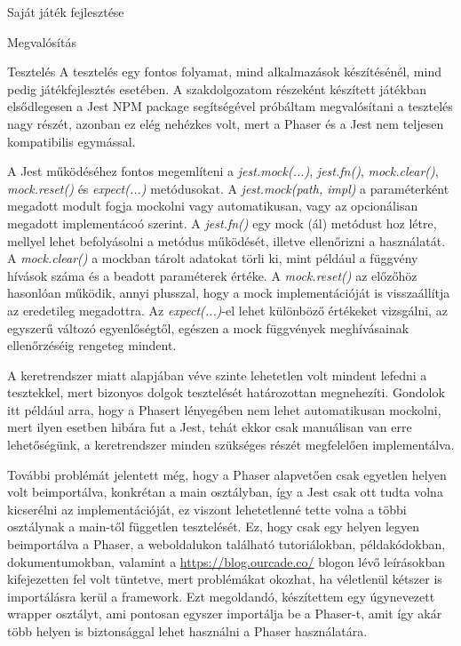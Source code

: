 \begin{MyChapter}{Saját játék fejlesztése}
\begin{MySection}{Megvalósítás}
	\end{MySection}
	
	\begin{MySection}{Tesztelés}
		A tesztelés egy fontos folyamat, mind alkalmazások készítésénél, mind pedig játékfejlesztés esetében. 
		A szakdolgozatom részeként készített játékban elsődlegesen a Jest NPM package segítségével próbáltam megvalósítani a tesztelés nagy részét, azonban ez elég nehézkes volt, mert a Phaser és a Jest nem teljesen kompatibilis egymással.
		
		A Jest működéséhez fontos megemlíteni a \textit{jest.mock(...)}, \textit{jest.fn()}, \textit{mock.clear()}, \textit{mock.reset()} és \textit{expect(...)} metódusokat.
		A \textit{jest.mock(path, impl)} a paraméterként megadott modult fogja mockolni vagy automatikusan, vagy az opcionálisan megadott implementácoó szerint.
		A \textit{jest.fn()} egy mock (ál) metódust hoz létre, mellyel lehet befolyásolni a metódus működését, illetve ellenőrizni a használatát.
		A \textit{mock.clear()} a mockban tárolt adatokat törli ki, mint például a függvény hívások száma és a beadott paraméterek értéke.
		A \textit{mock.reset()} az előzőhöz hasonlóan működik, annyi plusszal, hogy a mock implementációját is visszaállítja az eredetileg megadottra.
		Az \textit{expect(...)}-el lehet különböző értékeket vizsgálni, az egyszerű változó egyenlőségtől, egészen a mock függvények meghívásainak ellenőrzéséig rengeteg mindent.
		
		A keretrendszer miatt alapjában véve szinte lehetetlen volt mindent lefedni a tesztekkel, mert bizonyos dolgok tesztelését határozottan megnehezíti.
		Gondolok itt például arra, hogy a Phasert lényegében nem lehet automatikusan mockolni, mert ilyen esetben hibára fut a Jest, tehát ekkor csak manuálisan van erre lehetőségünk, a keretrendszer minden szükséges részét megfelelően implementálva.
		
		További problémát jelentett még, hogy a Phaser alapvetően csak egyetlen helyen volt beimportálva, konkrétan a main osztályban, így a Jest csak ott tudta volna kicserélni az implementációját, ez viszont lehetetlenné tette volna a többi osztálynak a main-től független tesztelését. Ez, hogy csak egy helyen legyen beimportálva a Phaser, a weboldalukon \cite{phaser_official_website} található tutoriálokban, példakódokban, dokumentumokban, valamint a \url{https://blog.ourcade.co/} blogon lévő leírásokban kifejezetten fel volt tüntetve, mert problémákat okozhat, ha véletlenül kétszer is importálásra kerül a framework. Ezt megoldandó, készítettem egy úgynevezett wrapper osztályt, ami pontosan egyszer importálja be a Phaser-t, amit így akár több helyen is biztonsággal lehet használni a Phaser használatára.
		

\end{MySection}
\end{MyChapter}

